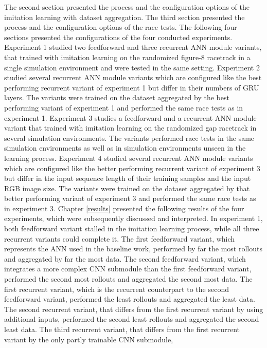 The second section presented the process and the configuration options of the imitation learning with dataset aggregation.
The third section presented the process and the configuration options of the race tests.
The following four sections presented the configurations of the four conducted experiments.
Experiment 1 studied two feedforward and three recurrent ANN module variants,
that trained with imitation learning
on the randomized figure-8 racetrack in a single simulation environment
and were tested in the same setting.
Experiment 2 studied several recurrent ANN module variants which 
are configured like the best performing recurrent variant of experiment 1
but differ in their numbers of GRU layers. 
The variants were trained on the dataset aggregated by the best performing variant of experiment 1
and performed the same race tests as in experiment 1.
Experiment 3 studies a feedforward and a recurrent ANN
module variant
that trained with imitation learning
on the randomized gap racetrack in several simulation environments.
The variants performed race tests in the same simulation environments
as well as in simulation environments unseen in the learning process.
Experiment 4 studied several recurrent ANN module variants which 
are configured like the better performing recurrent variant of experiment 3
but differ in the input sequence length of their training samples and 
the input RGB image size.
The variants were trained on the dataset aggregated by that better performing variant of experiment 3
and performed the same race tests as in experiment 3.
Chapter \ref{results} presented the following results of the four experiments,
which were subsequently discussed and interpreted.
In experiment 1, both feedforward variant stalled in the imitation learning process,
while all three recurrent variants could complete it.
The first feedforward variant, which represents the ANN used in the baseline work,
performed by far the most rollouts and aggregated by far the most data.
The second feedforward variant, which integrates a more complex CNN submodule than the first feedforward variant,
performed the second most rollouts and aggregated the second most data.
The first recurrent variant, which is the recurrent counterpart to the second feedforward variant,
performed the least rollouts and aggregated the least data.
The second recurrent variant, that differs from the first recurrent variant by using additional inputs,
performed the second least rollouts and aggregated the second least data.
The third recurrent variant, that differs from the first recurrent variant by the only partly trainable CNN submodule,
